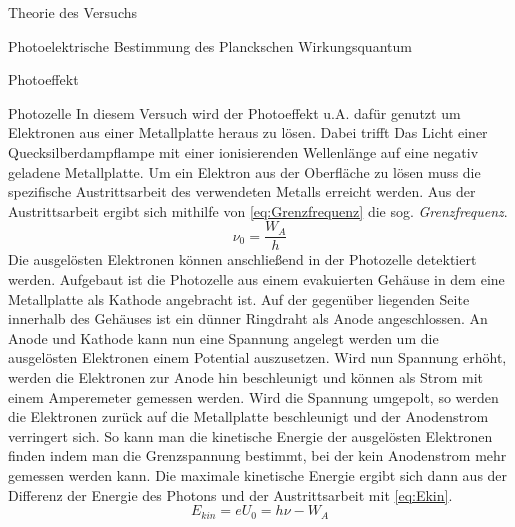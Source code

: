 \documentclass[pdftex, a4paper,11pt, twoside, ngerman]{report}
\begin{document}
\begin{chapter}{Theorie des Versuchs}
\begin{section}{Photoelektrische Bestimmung des Planckschen Wirkungsquantum}
\begin{subsection}{Photoeffekt}
      \end{subsection}
      
      
      
      \begin{subsection}{Photozelle}
	\label{chp:TheoriePhotoelektrischesWirkungsquantumPhotozelle}
	In diesem Versuch wird der Photoeffekt u.A. dafür genutzt um Elektronen aus einer Metallplatte heraus zu lösen. Dabei trifft Das Licht einer Quecksilberdampflampe mit einer ionisierenden Wellenlänge auf eine negativ geladene Metallplatte. Um ein Elektron aus der Oberfläche zu lösen muss die spezifische Austrittsarbeit des verwendeten Metalls erreicht werden. Aus der Austrittsarbeit ergibt sich mithilfe von \cref{eq:Grenzfrequenz} die sog. \textit{Grenzfrequenz}.
	\begin{equation}
	  \label{eq:Grenzfrequenz}
	  \nu_{0}=\frac{W_{A}}{h}
	\end{equation}
	Die ausgelösten Elektronen können anschließend in der Photozelle detektiert werden. Aufgebaut ist die Photozelle aus einem evakuierten Gehäuse in dem eine Metallplatte als Kathode angebracht ist. Auf der gegenüber liegenden Seite innerhalb des Gehäuses ist ein dünner Ringdraht als Anode angeschlossen. An Anode und Kathode kann nun eine Spannung angelegt werden um die ausgelösten Elektronen einem Potential auszusetzen. Wird nun Spannung erhöht, werden die Elektronen zur Anode hin beschleunigt und können als Strom mit einem Amperemeter gemessen werden. Wird die Spannung umgepolt, so werden die Elektronen zurück auf die Metallplatte beschleunigt und der Anodenstrom verringert sich. So kann man die kinetische Energie der ausgelösten Elektronen finden indem man die Grenzspannung bestimmt, bei der kein Anodenstrom mehr gemessen werden kann. Die maximale kinetische Energie ergibt sich dann aus der Differenz der Energie des Photons und der Austrittsarbeit mit \cref{eq:Ekin}.
	\begin{equation}
	  \label{eq:Ekin}
	  E_{kin}=eU_{0}=h\nu-W_{A}
	\end{equation}
	

\end{subsection}
\end{section}
\end{chapter}
\end{document}
